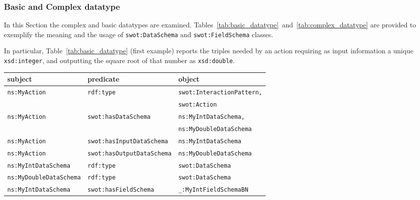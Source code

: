 \subsubsection{\textsf{Basic and Complex datatype}}
In this Section the complex and basic datatypes are examined. Tables~\ref{tab:basic_datatype}~and~\ref{tab:complex_datatype} are provided to exemplify the meaning and the usage of \texttt{swot:DataSchema} and \texttt{swot:Field\-Schema} classes.

In particular, Table~\ref{tab:basic_datatype} (first example) reports the triples needed by an action requiring as input information a unique \texttt{xsd:integer}, and outputting the square root of that number as \texttt{xsd:double}.

\begin{table*}[t]
\centering
\footnotesize
\caption{Examples of basic datatypes. White lines refer to the first example. Grey lines have to be added to realize the second example discussed in Section~\ref{ssec:dataschema_fieldschema} (Basic and Complex datatype).}
\label{tab:basic_datatype}
\begin{tabular}{lll}
\textbf{subject}           & \textbf{predicate}           & \textbf{object}           \\ \hline
\texttt{ns:MyAction}       & \texttt{rdf:type}            & \texttt{swot:InteractionPattern,}  \\ 
      &          & \texttt{swot:Action}  \\\hline
\texttt{ns:MyAction}       & \texttt{swot:hasDataSchema}   & \texttt{ns:MyIntDataSchema,} \\ 
  &   & \texttt{ns:MyDoubleDataSchema} \\\hline
\texttt{ns:MyAction}       & \texttt{swot:hasInputDataSchema} & \texttt{ns:MyIntDataSchema}  \\ \hline
\texttt{ns:MyAction}       & \texttt{swot:hasOutputDataSchema} & \texttt{ns:MyDoubleDataSchema}  \\ \hline
\texttt{ns:MyIntDataSchema}& \texttt{rdf:type}            & \texttt{swot:DataSchema}   \\ \hline
\texttt{ns:MyDoubleDataSchema} & \texttt{rdf:type}        & \texttt{swot:DataSchema}   \\ \hline
\texttt{ns:MyIntDataSchema}& \texttt{swot:hasFieldSchema}  & \texttt{\_:MyIntFieldSchemaBN} \\ \hline

\end{tabular}
\end{table*}
